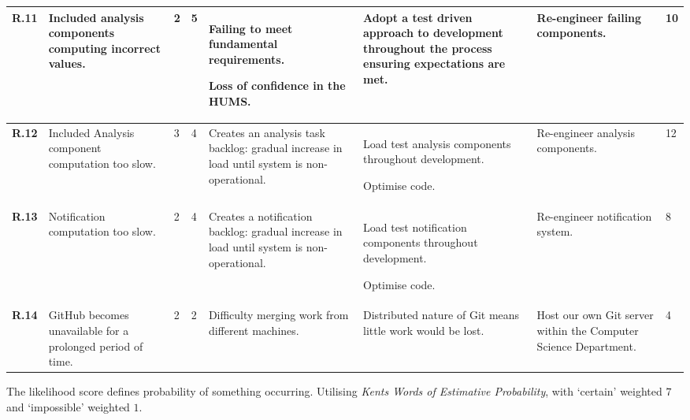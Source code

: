 \begin{longtable}[H]{| p{0.6cm} | p{2.2cm} | p{0.26cm} | p{0.26cm} | p{2.7cm} | p{3cm} | p{2.6cm} | p{0.4cm} |}
  \hline \textbf{R.11}
  & Included analysis components computing incorrect values.
  & 2
  & 5
  & Failing to meet fundamental requirements.
  
  Loss of confidence in the HUMS.
  & Adopt a test driven approach to development throughout the process
  ensuring expectations are met.
  & Re-engineer failing components.
  & 10\\
  
  \hline \textbf{R.12}
  & Included Analysis component computation too slow.
  & 3
  & 4
  & Creates an analysis task backlog: gradual increase in load until system
  is non-operational.
  & Load test analysis components throughout development.
  
    Optimise code.
  & Re-engineer analysis components.
  & 12\\  
  
  \hline \textbf{R.13}
  & Notification computation too slow.
  & 2
  & 4
  & Creates a notification backlog: gradual increase in load until system
  is non-operational.
  & Load test notification components throughout development.
 
  Optimise code.
  & Re-engineer notification system.
  & 8\\
  
  \hline \textbf{R.14}
  & GitHub becomes unavailable for a prolonged period of time.
  & 2
  & 2
  & Difficulty merging work from different machines.
  & Distributed nature of Git means little work would be lost.
  & Host our own Git server within the Computer Science Department.
  & 4\\ 
    \hline
\end{longtable}       

The likelihood score defines probability of something occurring. Utilising
\textit{Kents Words of Estimative Probability}\cite{kent1966strategic}, with
`certain' weighted $7$ and `impossible' weighted $1$.

